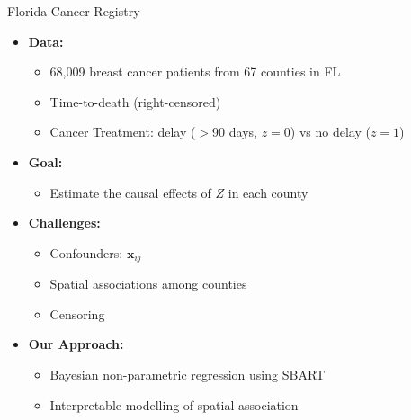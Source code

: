 \documentclass{beamer}
\begin{document}
\begin{frame}{Florida Cancer Registry}
    \begin{itemize}
      \vfill \item \textbf{Data:}
      \begin{itemize}
        \vfill \item 68,009 breast cancer patients from 67 counties in FL
        \vfill \item Time-to-death (right-censored)
        \vfill \item  Cancer Treatment: delay ($>$90 days, $z=0$) vs no delay ($z=1$)
      \end{itemize}
      \vspace{6pt}
      \vfill \item \textbf{Goal:}
      \begin{itemize}
        \vfill \item Estimate the causal effects of $Z$ in each county
        
        \end{itemize}
        \pause
        \vfill \item \textbf{Challenges:}
        \begin{itemize}

        \vfill \item Confounders: $\mathbf{x}_{ij}$
        \vfill \item Spatial associations among counties
        \vfill \item Censoring
      \end{itemize}
      \vspace{6pt}
      \vfill \item \textbf{Our Approach:}
      \begin{itemize}
        \vfill \item Bayesian non-parametric regression using SBART
        \vfill \item Interpretable modelling of spatial association 
      \end{itemize}
    \end{itemize}
    \end{frame}
\end{document}
